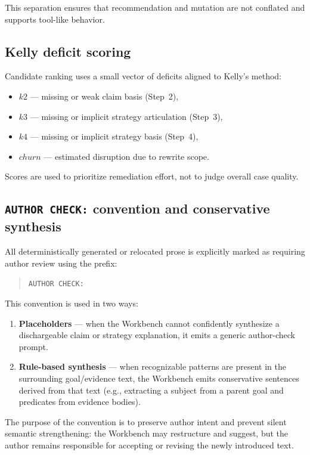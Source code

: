 \documentclass[12pt,twoside,a4paper]{article}
\begin{document}
This separation ensures that recommendation and mutation are not conflated and supports tool-like behavior.

\subsection{Kelly deficit scoring}

Candidate ranking uses a small vector of deficits aligned to Kelly’s method:

\begin{itemize}
  \item $k2$ --- missing or weak claim basis (Step~2),
  \item $k3$ --- missing or implicit strategy articulation (Step~3),
  \item $k4$ --- missing or implicit strategy basis (Step~4),
  \item $churn$ --- estimated disruption due to rewrite scope.
\end{itemize}

Scores are used to prioritize remediation effort, not to judge overall case quality.

\subsection{\texttt{AUTHOR CHECK:} convention and conservative synthesis}

All deterministically generated or relocated prose is explicitly marked as requiring author review using the prefix:

\begin{quote}
\texttt{AUTHOR CHECK:}
\end{quote}

This convention is used in two ways:

\begin{enumerate}
  \item \textbf{Placeholders} --- when the Workbench cannot confidently synthesize a dischargeable claim or strategy explanation, it emits a generic author-check prompt.
  \item \textbf{Rule-based synthesis} --- when recognizable patterns are present in the surrounding goal/evidence text, the Workbench emits conservative sentences derived from that text (e.g., extracting a subject from a parent goal and predicates from evidence bodies).
\end{enumerate}

The purpose of the convention is to preserve author intent and prevent silent semantic strengthening: the Workbench may restructure and suggest, but the author remains responsible for accepting or revising the newly introduced text.
\end{document}
